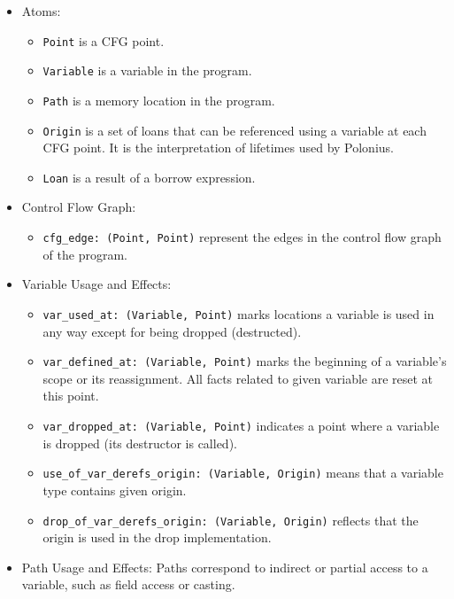 \documentclass[
  11pt,
  twoside,symmetric]{report}
\providecommand{\tightlist}{%
  \setlength{\itemsep}{0pt}\setlength{\parskip}{0pt}}
\begin{document}
\begin{itemize}
\tightlist
\item
  Atoms:

  \begin{itemize}
  \tightlist
  \item
    \texttt{Point} is a CFG point.
  \item
    \texttt{Variable} is a variable in the program.
  \item
    \texttt{Path} is a memory location in the program.
  \item
    \texttt{Origin} is a set of loans that can be referenced using a
    variable at each CFG point. It is the interpretation of lifetimes
    used by Polonius.
  \item
    \texttt{Loan} is a result of a borrow expression.
  \end{itemize}
\item
  Control Flow Graph:

  \begin{itemize}
  \tightlist
  \item
    \texttt{cfg\_edge:\ (Point,\ Point)} represent the edges in the
    control flow graph of the program.
  \end{itemize}
\item
  Variable Usage and Effects:

  \begin{itemize}
  \tightlist
  \item
    \texttt{var\_used\_at:\ (Variable,\ Point)} marks locations a
    variable is used in any way except for being dropped (destructed).
  \item
    \texttt{var\_defined\_at:\ (Variable,\ Point)} marks the beginning
    of a variable's scope or its reassignment. All facts related to
    given variable are reset at this point.
  \item
    \texttt{var\_dropped\_at:\ (Variable,\ Point)} indicates a point
    where a variable is dropped (its destructor is called).
  \item
    \texttt{use\_of\_var\_derefs\_origin:\ (Variable,\ Origin)} means
    that a variable type contains given origin.
  \item
    \texttt{drop\_of\_var\_derefs\_origin:\ (Variable,\ Origin)}
    reflects that the origin is used in the drop implementation.
  \end{itemize}
\item
  Path Usage and Effects: Paths correspond to indirect or partial access
  to a variable, such as field access or casting.


\end{itemize}
\end{document}
